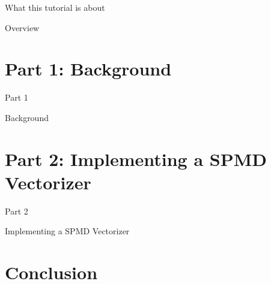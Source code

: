 \documentclass[t,aspectratio=169]{beamer}
\newcommand{\talkpart}[2]{%
\section{Part #1: #2}

\begin{frame}[c]{Part #1}

\vspace{1cm}
\centerline{\LARGE{#2}}

\end{frame}}
\begin{document}
\begin{frame}{What this tutorial is about}
\begin{minipage}[t]{0.25\linewidth}

\end{minipage}

\end{frame}


\begin{frame}{Overview}
\tableofcontents
\end{frame}


\talkpart{1}{Background}


\talkpart{2}{Implementing a SPMD Vectorizer}





%


\section*{Conclusion}
\end{document}
